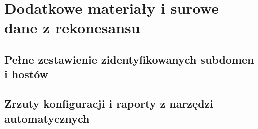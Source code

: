 \chapter{Dodatkowe materiały i surowe dane z rekonesansu}\label{app:przykladowy}

\section{Pełne zestawienie zidentyfikowanych subdomen i hostów}\label{sec:app-subdomeny}

\section{Zrzuty konfiguracji i raporty z narzędzi automatycznych}\label{sec:app-raporty}
